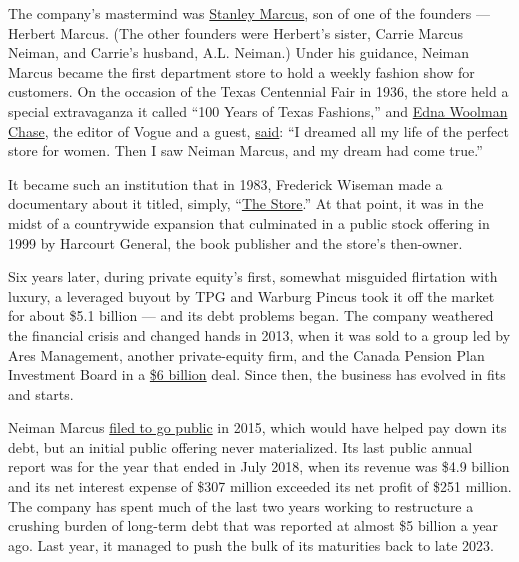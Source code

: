 The company's mastermind was
\href{https://www.nytimes3xbfgragh.onion/2016/12/01/t-magazine/fashion/neiman-marcus-history-dallas-texas.html}{Stanley
Marcus}, son of one of the founders --- Herbert Marcus. (The other
founders were Herbert's sister, Carrie Marcus Neiman, and Carrie's
husband, A.L. Neiman.) Under his guidance, Neiman Marcus became the
first department store to hold a weekly fashion show for customers. On
the occasion of the Texas Centennial Fair in 1936, the store held a
special extravaganza it called ``100 Years of Texas Fashions,'' and
\href{https://www.nytimes3xbfgragh.onion/1957/03/21/archives/edna-woolman-chase-dies-at-80-retired-vogue-magazine-editor-fashion.html}{Edna
Woolman Chase}, the editor of Vogue and a guest,
\href{https://www.commentarymagazine.com/articles/william-schack/neiman-marcus-of-texascouture-and-culture/}{said}:
``I dreamed all my life of the perfect store for women. Then I saw
Neiman Marcus, and my dream had come true.''

It became such an institution that in 1983, Frederick Wiseman made a
documentary about it titled, simply,
``\href{https://www.nytimes3xbfgragh.onion/1983/12/14/movies/tv-the-store-a-wiseman-film.html}{The
Store}.'' At that point, it was in the midst of a countrywide expansion
that culminated in a public stock offering in 1999 by Harcourt General,
the book publisher and the store's then-owner.

Six years later, during private equity's first, somewhat misguided
flirtation with luxury, a leveraged buyout by TPG and Warburg Pincus
took it off the market for about \$5.1 billion --- and its debt problems
began. The company weathered the financial crisis and changed hands in
2013, when it was sold to a group led by Ares Management, another
private-equity firm, and the Canada Pension Plan Investment Board in a
\href{https://dealbook.nytimes3xbfgragh.onion/2013/09/09/neiman-marcus-is-sold-for-6-billion/}{\$6
billion} deal. Since then, the business has evolved in fits and starts.

Neiman Marcus
\href{https://www.nytimes3xbfgragh.onion/2015/08/05/business/dealbook/neiman-marcus-files-to-go-public-again.html}{filed
to go public} in 2015, which would have helped pay down its debt, but an
initial public offering never materialized. Its last public annual
report was for the year that ended in July 2018, when its revenue was
\$4.9 billion and its net interest expense of \$307 million exceeded its
net profit of \$251 million. The company has spent much of the last two
years working to restructure a crushing burden of long-term debt that
was reported at almost \$5 billion a year ago. Last year, it managed to
push the bulk of its maturities back to late 2023.

